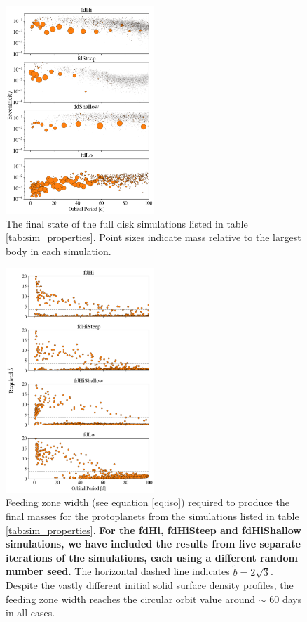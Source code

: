 \documentclass[twocolumn,linenumbers]{aastex63}
\begin{document}
\begin{figure}
\begin{center}
    \includegraphics[width=0.5\textwidth]{figures/surfden_profiles.png}
    \caption{The final state of the full disk simulations listed in table \ref{tab:sim_properties}. 
    Point sizes indicate mass relative to the largest body in each simulation.\label{fig:surfden_profiles}}
\end{center}
\end{figure}

\begin{figure}
\begin{center}
    \includegraphics[width=0.5\textwidth]{figures/surfden_b.png}
    \caption{Feeding zone width (see equation \ref{eq:iso}) required to produce the final masses for the protoplanets from the 
    simulations listed in table \ref{tab:sim_properties}. \textbf{For the fdHi, fdHiSteep and fdHiShallow simulations, we have included the results from five separate iterations of the simulations, each using a different random number seed.} The horizontal dashed line indicates $\tilde{b} = 2 \sqrt{3}$. Despite the 
    vastly different initial solid surface density profiles, the feeding zone width reaches the circular orbit value around $\sim$ 60 
    days in all cases. \label{fig:surfden_b}}
\end{center}
\end{figure}
\end{document}
